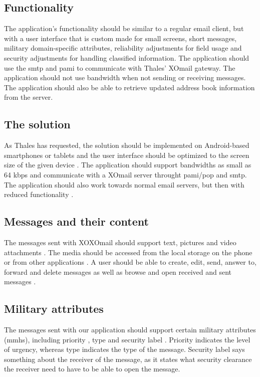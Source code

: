 \subsection{Functionality}
The application's functionality should be similar to a regular email client, but with a user interface that is custom made for small screens, short messages, military domain-specific attributes, reliability adjustments for field usage and security adjustments for handling classified information. The application should use the \gls{smtp} and \gls{pami} to communicate with Thales' XOmail gateway.
\newline
\newline
The application should not use bandwidth when not sending or receiving messages. The application should also be able to retrieve updated address book information from the server.

\subsection{The solution}
As Thales has requested, the solution should be implemented on Android-based smartphones or tablets  and the user interface should be optimized to the screen size of the given device . The application should support bandwidths as small as 64 kbps  and communicate with a XOmail server throught \gls{pami}/\gls{pop} and \gls{smtp}. The application should also work towards normal email servers, but then with reduced functionality .

\subsection{Messages and their content}
The messages sent with XOXOmail should support text, pictures and video attachments . The media should be accessed from the local storage on the phone or from other applications . A user should be able to create, edit, send, answer to, forward and delete messages as well as browse and open received and sent messages .

\subsection{Military attributes}
The messages sent with our application should support certain military attributes (\gls{mmhs}), including priority , type  and security label . Priority indicates the level of urgency, whereas type indicates the type of the message. Security label says something about the receiver of the message, as it states what security clearance the receiver need to have to be able to open the message.

